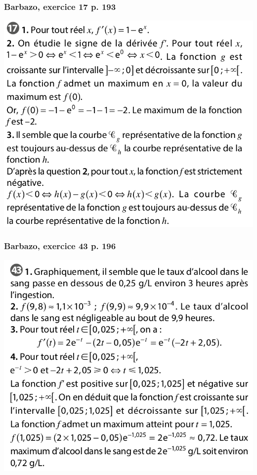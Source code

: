 \documentclass[11pt, hyperref={urlcolor=red,%
            linkcolor=blue, %
            colorlinks=true}]{beamer}
\begin{document}
\begin{frame}
\frametitle{Barbazo, exercice 17 p. 193}
\label{exo17}
\begin{center}
	\includegraphics[scale=0.3]{exo17.png}
\end{center}
\end{frame}

\begin{frame}
\frametitle{Barbazo, exercice 43 p. 196}
\label{exo43}
\begin{center}
	\includegraphics[scale=0.3]{exo43.png}
\end{center}
\end{frame}
\end{document}
